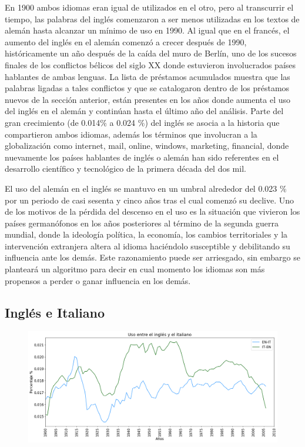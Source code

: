 En 1900 ambos idiomas eran igual de utilizados en el otro, pero al transcurrir el tiempo, las palabras del inglés comenzaron a ser menos utilizadas en los textos de alemán hasta alcanzar un mínimo de uso en 1990.  Al igual que en el francés, el aumento del inglés en el alemán comenzó a crecer después de 1990,  históricamente un año después de la caída del muro de Berlín, uno de los sucesos finales de los conflictos bélicos del siglo XX donde estuvieron involucrados países hablantes de ambas lenguas. La lista de préstamos acumulados muestra que las palabras ligadas a tales conflictos y que se catalogaron dentro de los préstamos nuevos de la sección anterior, están presentes en los años donde aumenta el uso del inglés en el alemán y continúan hasta el último año del análisis. Parte del gran crecimiento (de 0.014$\%$ a 0.024 $\%$) del inglés se asocia a la historia que compartieron ambos idiomas,  además los términos que involucran a la globalización como internet, mail, online, windows, marketing, financial, donde nuevamente los países hablantes de inglés o alemán han sido referentes en el desarrollo  científico y tecnológico de la primera década del dos mil.

El uso  del alemán en el inglés  se mantuvo en un umbral alrededor del 0.023 $\%$  por un periodo de casi sesenta y cinco años tras el cual comenzó su declive. Uno de los motivos de la pérdida del descenso en el uso es la situación que vivieron los países germanófonos en los años posteriores al término de la segunda guerra mundial,  donde la ideología política, la economía, los cambios territoriales y la intervención extranjera altera al idioma haciéndolo susceptible y debilitando su influencia ante los demás.  Este razonamiento puede ser arriesgado, sin embargo se planteará un algoritmo para decir en cual momento los idiomas son más propensos a perder  o ganar influencia en los demás.


\newpage
\subsection{Inglés e Italiano}

\begin{figure}[h!]
	\centering
	\includegraphics[scale=.38]{Cap_3/SF_3_S2_EN.png}
	\label{SF_EI}
	\caption{}
\end{figure}

